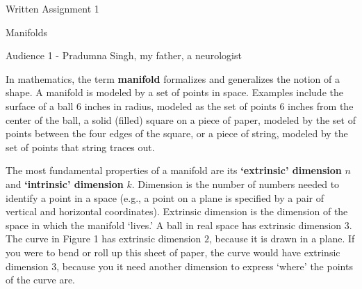 \documentclass[11pt]{article}
\begin{document}

\begin{center}
Written Assignment 1

Manifolds
\end{center}

\vspace{-0.1in}
\noindent
Audience 1 - Pradumna Singh, my father, a neurologist

In mathematics, the term {\bf manifold} formalizes and generalizes the notion
of a shape. A manifold is modeled by a set of points in space. Examples include
the surface of a ball 6 inches in radius, modeled as the set of points 6 inches
from the center of the ball, a solid (filled) square on a piece of paper,
modeled by the set of points between the four edges of the square, or a piece
of string, modeled by the set of points that string traces out.

The most fundamental properties of a manifold are its {\bf `extrinsic'
dimension} $n$ and {\bf `intrinsic' dimension} $k$. Dimension is the number of
numbers needed to identify a point in a space (e.g., a point on a plane is
specified by a pair of vertical and horizontal coordinates). Extrinsic
dimension is the dimension of the space in which the manifold `lives.' A ball
in real space has extrinsic dimension $3$. The curve in Figure 1 has extrinsic
dimension $2$, because it is drawn in a plane. If you were to bend or roll up
this sheet of paper, the curve would have extrinsic dimension $3$, because you
it need another dimension to express `where' the points of the curve are.
\end{document}
